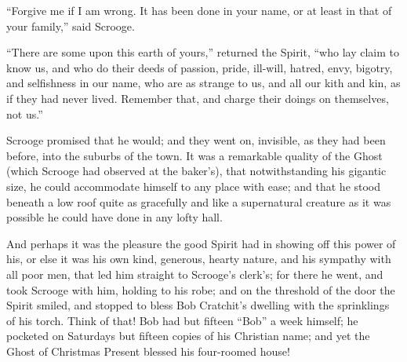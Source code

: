 \documentclass[paper=a5,BCOR=15mm,twoside,DIV=15,headinclude=off,12pt,chapterprefix=off,openany,headings=huge]{scrbook} %
\begin{document}
\enquote{Forgive me if I am wrong. It has been done in your name, or at least in that of your family,} said Scrooge.

\enquote{There are some upon this earth of yours,} returned the Spirit, \enquote{who lay claim to know us, and who do their deeds of passion, pride, ill-will, hatred, envy, bigotry, and selfishness in our name, who are as strange to us, and all our kith and kin, as if they had never lived. Remember that, and charge their doings on themselves, not us.}


Scrooge promised that he would; and they went on, invisible, as they had been before, into the suburbs of the town. It was a remarkable quality of the Ghost (which Scrooge had observed at the baker's), that notwithstanding his gigantic size, he could accommodate himself to any place with ease; and that he stood beneath a low roof quite as gracefully and like a supernatural creature as it was possible he could have done in any lofty hall.

And perhaps it was the pleasure the good Spirit had in showing off this power of his, or else it was his own kind, generous, hearty nature, and his sympathy with all poor men, that led him straight to Scrooge's clerk's; for there he went, and took Scrooge with him, holding to his robe; and on the threshold of the door the Spirit smiled, and stopped to bless Bob Cratchit's dwelling with the sprinklings of his torch. Think of that! Bob had but fifteen \enquote{Bob} a week himself; he pocketed on Saturdays but fifteen copies of his Christian name; and yet the Ghost of Christmas Present blessed his four-roomed house!
\end{document}
